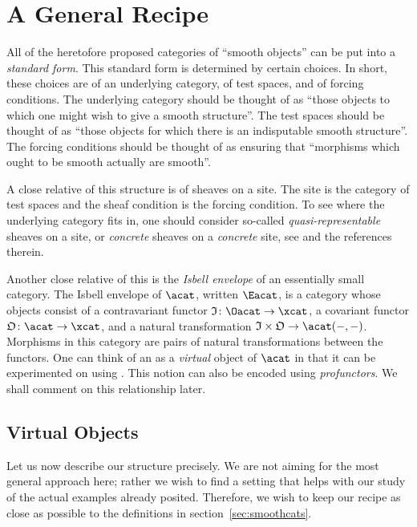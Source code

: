 \documentclass[%
a4paper,%
arxiv,%
defaults
]{myclass}
\begin{document}
\section{A General Recipe}
\label{sec:recipe}

All of the heretofore proposed categories of ``smooth objects'' can be put into a \emph{standard form}.
This standard form is determined by certain choices.
In short, these choices are of an underlying category, of test spaces, and of forcing conditions.
The underlying category should be thought of as ``those objects to which one might wish to give a smooth structure''.
The test spaces should be thought of as ``those objects for which there is an indisputable smooth structure''.
The forcing conditions should be thought of as ensuring that ``morphisms which ought to be smooth actually are smooth''.

A close relative of this structure is of sheaves on a site.
The site is the category of test spaces and the sheaf condition is the forcing condition.
To see where the underlying category fits in, one should consider so\hyp{}called \emph{quasi\hyp{}representable} sheaves on a site, or \emph{concrete} sheaves on a \emph{concrete} site, see \cite{0807.1704} and the references therein.

Another close relative of this is the \emph{Isbell envelope} of an essentially small category.
The Isbell envelope of \(\acat\), written \(\Eacat\), is a category whose objects consist of a contravariant functor \(\itest \colon \Oacat \to \xcat\), a covariant functor \(\otest \colon \acat \to \xcat\), and a natural transformation \(\itest \times \otest \to \Hom{\acat}{-}{-}\).
Morphisms in this category are pairs of natural transformations between the functors.
One can think of an \Eaobj as a \emph{virtual} object of \(\acat\) in that it can be experimented on using \aobjs.
This notion can also be encoded using \emph{profunctors}.
We shall comment on this relationship later.


\subsection{Virtual Objects}

Let us now describe our structure precisely.
We are not aiming for the most general approach here; rather we wish to find a setting that helps with our study of the actual examples already posited.
Therefore, we wish to keep our recipe as close as possible to the definitions in section~\ref{sec:smoothcats}.
\end{document}
